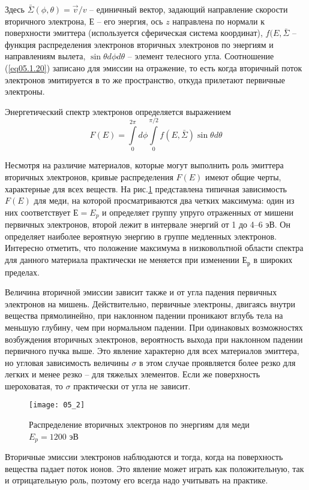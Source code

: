 Здесь \( \bar{\Sigma}(\phi,\theta) = \vec{v}/v \) -- единичный вектор, 
задающий направление скорости вторичного электрона, \( Е \) -- его энергия, 
ось \( z \)  направлена по нормали к поверхности эмиттера (используется 
сферическая система координат), \( f(E,\bar{\Sigma} \) -- функция 
распределения электронов вторичных электронов по энергиям и направлениям 
вылета, \( \sin\theta d\phi d\theta \) -- элемент телесного угла. Соотношение 
(\ref{eq05.1.20}) записано для эмиссии на отражение, то есть когда вторичный 
поток электронов эмитируется в то же пространство, откуда прилетают первичные 
электроны.

Энергетический спектр электронов определяется выражением
\begin{equation}
    F(E) = \int\limits_{0}^{2\pi} d\phi 
        \int\limits_{0}^{\pi/2} f(E,\bar{\Sigma}) \sin\theta d\theta
    \label{eq05.1.21}
\end{equation}

Несмотря на различие материалов, которые могут выполнить роль эмиттера 
вторичных электронов, кривые распределения \( F(E) \) имеют общие черты, 
характерные для всех веществ. На рис.\ref{img05.2} представлена типичная 
зависимость \( F(E) \) для меди, на которой просматриваются два четких 
максимума: один из них соответствует \( Е = E_p \) и определяет группу упруго 
отраженных от мишени первичных электронов, второй лежит в интервале энергий от 
1 до 4–6 эВ. Он определяет наиболее вероятную энергию в группе медленных 
электронов. Интересно отметить, что положение максимума в низковольтной 
области спектра  для  данного  материала практически не меняется при изменении 
\( Е_р \) в широких пределах.

Величина вторичной эмиссии зависит также и от угла падения первичных 
электронов на мишень. Действительно, первичные электроны, двигаясь внутри 
вещества прямолинейно, при наклонном падении проникают вглубь тела на меньшую 
глубину, чем при нормальном падении. При одинаковых возможностях возбуждения 
вторичных электронов, вероятность выхода при наклонном падении первичного 
пучка выше. Это явление характерно для всех материалов эмиттера, но угловая 
зависимость величины \( \sigma \) в этом случае проявляется более резко для 
легких и менее резко -- для тяжелых элементов. Если же поверхность 
шероховатая, то \( \sigma \) практически от угла не зависит.
\begin{figure}[h]
    \center
    \texttt{[image: 05\_2]}
    \caption{Распределение вторичных электронов по энергиям для меди 
        \( E_p = 1200 \) эВ}
    \label{img05.2}
\end{figure}

Вторичные эмиссии электронов наблюдаются и тогда, когда на поверхность 
вещества падает поток ионов. Это явление может играть как положительную, так 
и отрицательную роль, поэтому его всегда надо учитывать на практике.
